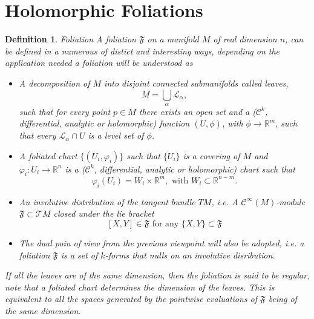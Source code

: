 \documentclass[12pt,twoside,a4paper]{report}
\newtheorem{definition}{Definition}[section]
\newcommand{\re}{\ensuremath{\mathbb R }}
\begin{document}
  \section{Holomorphic Foliations}

  \begin{definition}{Foliation}
  A foliation $\mathfrak{F}$ on a manifold $M$ of real dimension $n$, can be defined in a numerous of distict and interesting ways, depending on the application needed a foliation will be understood as
  \begin{itemize}
    \item A decomposition of $M$ into disjoint connected submanifolds called \emph{leaves},
          \[
            M=\bigcup_{\alpha}\mathcal{L_{\alpha}},
          \]
          \noindent such that for every point $p\in M$ there exists an open set and a ($\mathcal{C}^{k}$, differential, analytic or holomorphic) function $(U,\phi)$, with $\phi\rightarrow\re^{m}$, such that every $\mathcal{L}_{\alpha}\cap U$ is a level set of $\phi$.
    \item A \emph{foliated chart} $\{(U_{i},\varphi_{i})\}$ such that $\{U_{i}\}$ is a covering of $M$ and $\varphi_{i}:U_{i}\rightarrow\re^{n}$ is a ($\mathcal{C}^{k}$, differential, analytic or holomorphic) chart such that
          \[
            \varphi_{i}(U_{i})=W_{i}\times\re^{m},\text{ with }W_{i}\subset\re^{n-m}.
          \]
        \item An \emph{involutive} distribution of the tangent bundle $TM$, i.e. A $\mathcal{C}^{\infty}(M)$-module $\mathfrak{F}\subset\mathcal{T}M$ closed under the lie bracket
          \[
            [X,Y]\in\mathfrak{F}\text{ for any } \{X,Y\}\subset\mathfrak{F}
          \]
    \item The dual poin of view from the previous viewpoint will also be adopted, i.e. a foliation $\mathfrak{F}$ is a set of $k$-forms that nulls on an involutive disribution.
  \end{itemize}

  If all the leaves are of the same dimension, then the foliation is said to be \emph{regular}, note that a foliated chart determines the dimension of the leaves. This is equivalent to all the spaces generated by the pointwise evaluations of $\mathfrak{F}$ being of the same dimension.
  \end{definition}
\end{document}
